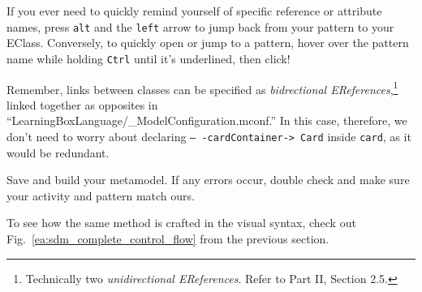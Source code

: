 \begin{itemize}
\itemWithRightTriangle If you ever need to quickly remind yourself of specific reference or attribute names, press \texttt{alt} and the \texttt{left}
arrow to jump back from your pattern to your EClass. Conversely, to quickly open
or jump to a pattern, hover over the pattern name while holding \texttt{Ctrl}
until it's underlined, then click!

\itemWithRightTriangle Remember, links between classes can be specified as \emph{bidrectional EReferences},\footnote{Technically two
\emph{unidirectional EReferences}. Refer to Part II, Section 2.5.} linked together as opposites in ``LearningBoxLanguage/\_Mod\-el\-Config\-uration.mconf.'' In this case,
therefore, we don't need to worry about declaring \texttt{\color{RED}--
-cardContainer-> Card} inside \texttt{card}, as it would be redundant.

\itemWithRightTriangle Save and build your metamodel. If any errors occur, double check and make sure your activity and pattern match ours. 

\itemWithRightTriangle To see how the same method is crafted in the visual syntax, check out Fig.~\ref{ea:sdm_complete_control_flow} from the previous
section.

\end{itemize}

